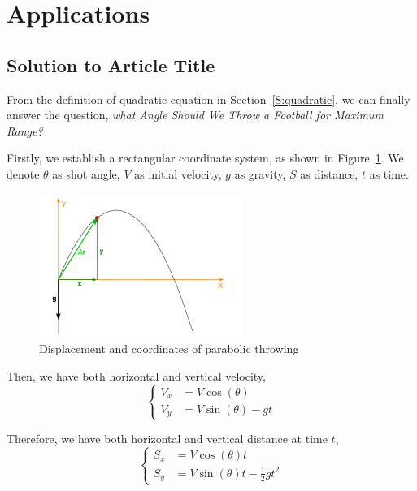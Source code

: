 \section{Applications}\label{S:applications}
\subsection{Solution to Article Title}
From the definition of quadratic equation in Section~\ref{S:quadratic}, we can finally answer the question, \emph{what Angle Should We Throw a Football for Maximum Range?}

Firstly, we establish a rectangular coordinate system, as shown in Figure~\ref{F:parabolic-throwing}. We denote $\theta$ as shot angle, $V$ as initial velocity, $g$ as gravity, $S$ as distance, $t$ as time.

\begin{figure}
    \centering
    \includegraphics[width=.45\textwidth]{figures/quadratic_equation-3.png}
    \caption{Displacement and coordinates of parabolic throwing}\label{F:parabolic-throwing}
\end{figure}

Then, we have both horizontal and vertical velocity,
\begin{equation}\label{E:solution-1}
    \begin{cases}
        V_x &= V\cos(\theta) \\
        V_y &= V\sin(\theta) - gt
    \end{cases}
\end{equation}

Therefore, we have both horizontal and vertical distance at time $t$,
\begin{equation}\label{E:solution-2}
    \begin{cases}
        S_x &= V\cos(\theta)t \\
        S_y &= V\sin(\theta)t - \frac{1}{2} gt^2
    \end{cases}
\end{equation}

